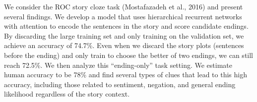 We consider the ROC story cloze task (Mostafazadeh et al., 2016) and present several findings. We develop a model that uses hierarchical recurrent networks with attention to encode the sentences in the story and score candidate endings. By discarding the large training set and only training on the validation set, we achieve an accuracy of 74.7\%. Even when we discard the story plots (sentences before the ending) and only train to choose the better of two endings, we can still reach 72.5\%. We then analyze this ``ending-only'' task setting. We estimate human accuracy to be 78\% and find several types of clues that lead to this high accuracy, including those related to sentiment, negation, and general ending likelihood regardless of the story context.
